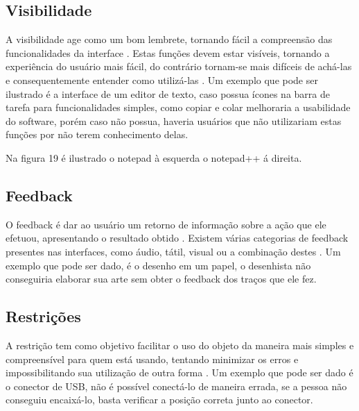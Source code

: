 \documentclass[12pt,oneside,a4paper,chapter=TITLE,section=TITLE,sumario=tradicional]{abntex2}
\begin{document}
\subsection{Visibilidade}
\label{sec:visibilidade}

A visibilidade age como um bom lembrete, tornando fácil a compreensão das funcionalidades da interface \cite{norman2002}. Estas funções devem estar visíveis, tornando a experiência do usuário mais fácil, do contrário tornam-se mais difíceis de achá-las e consequentemente entender como utilizá-las \cite{agni2015}. Um exemplo que pode ser ilustrado é a interface de um editor de texto, caso possua ícones na barra de tarefa para funcionalidades simples, como copiar e colar melhoraria a usabilidade do software, porém caso não possua, haveria usuários que não utilizariam estas funções por não terem conhecimento delas.

Na figura 19 é ilustrado o notepad à esquerda o notepad++ á direita.

\begin{figure}[htb]
\end{figure}

\subsection{Feedback}
\label{sec:feedback}

O feedback é dar ao usuário um retorno de informação sobre a ação que ele efetuou, apresentando o resultado obtido \cite{norman2002}. Existem várias categorias de feedback presentes nas interfaces, como áudio, tátil, visual ou a combinação destes \cite{agni2015}. Um exemplo que pode ser dado, é o desenho em um papel, o desenhista não conseguiria elaborar sua arte sem obter o feedback dos traços que ele fez.

\subsection{Restrições}
\label{sec:restricoes}

A restrição tem como objetivo facilitar o uso do objeto da maneira mais simples e compreensível para quem está usando, tentando minimizar os erros e impossibilitando sua utilização de outra forma \cite{norman2002}. Um exemplo que pode ser dado é o conector de USB, não é possível conectá-lo de maneira errada, se a pessoa não conseguiu encaixá-lo, basta verificar a posição correta junto ao conector.
\end{document}
